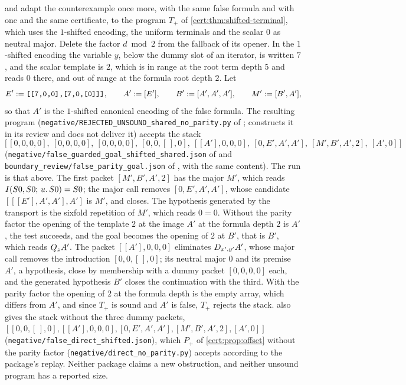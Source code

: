  and  adapt the counterexample
once more, with the same false formula and with one and the same certificate, to
the program $T_{+}$ of \cref{cert:thm:shifted-terminal}, which uses the
$1$-shifted encoding, the uniform terminals and the scalar $0$ as neutral major.
Delete the factor $d\bmod 2$ from the fallback of its opener. In the $1$-shifted
encoding the variable $y$, below the dummy slot of an iterator, is written $7$,
and the scalar template is $2$, which is in range at the root term depth $5$ and
reads $0$ there, and out of range at the formula root depth $2$. Let
\[
E'\mathrel{:=}\texttt{[[7,0,0],[7,0,[0]]]},\qquad A'\mathrel{:=}[E'],\qquad
B'\mathrel{:=}[A',A',A'],\qquad M'\mathrel{:=}[B',A'],
\]
so that $A'$ is the $1$-shifted canonical encoding of the false formula. The
resulting program (\texttt{negative/REJECTED\_UNSOUND\_shared\_no\_parity.py} of
;  constructs it in its review
and does not deliver it) accepts the stack
\[
\bigl[\,[0,0,0,0],\ [0,0,0,0],\ [0,0,0,0],\ [0,0,[\,],0],\ [[A'],0,0,0],\
[0,E',A',A'],\ [M',B',A',2],\ [A',0]\,\bigr]
\]
(\texttt{negative/false\_guarded\_goal\_shifted\_shared.json} of
\pkg{shifted\_shared\_leaf} and \texttt{boundary\_review/false\_parity\_goal.json}
of \pkg{468\_shared\_leaf}, with the same content). The run is that above. The
first packet $[M',B',A',2]$ has the major $M'$, which reads
$I(S 0,S 0;\,u.\,S 0)=S 0$; the major call removes $[0,E',A',A']$,
whose candidate $[[[E'],A',A'],A']$ is $M'$, and closes. The hypothesis generated
by the transport is the sixfold repetition of $M'$, which reads $0=0$. Without the
parity factor the opening of the template $2$ at the image $A'$ at the formula
depth $2$ is $A'$, the test succeeds, and the goal becomes the opening of $2$ at
$B'$, that is $B'$, which reads $Q_{z}A'$. The packet $[[A'],0,0,0]$ eliminates
$D_{x',y'}A'$, whose major call removes the introduction $[0,0,[\,],0]$; its
neutral major $0$ and its premise $A'$, a hypothesis, close by membership with a
dummy packet $[0,0,0,0]$ each, and the generated hypothesis $B'$ closes the
continuation with the third. With the parity factor the opening of $2$ at the
formula depth is the empty array, which differs from $A'$, and since $T_{+}$ is
sound and $A'$ is false, $T_{+}$ rejects the stack. \pkg{shifted\_shared\_leaf}
also gives the stack without the three dummy packets,
$[[0,0,[\,],0],[[A'],0,0,0],[0,E',A',A'],[M',B',A',2],[A',0]]$
(\texttt{negative/false\_direct\_shifted.json}), which $P_{+}$ of
\cref{cert:prop:offset} without the parity factor
(\texttt{negative/direct\_no\_parity.py}) accepts according to the package's
replay. Neither package claims a new obstruction, and neither unsound program has
a reported size.

